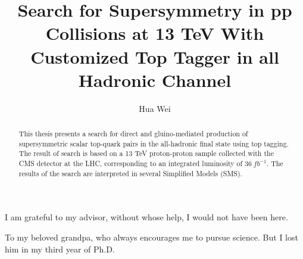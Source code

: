 \documentclass[oneside,final,letterpaper]{ucr}
\begin{document}

\title{Search for Supersymmetry in pp Collisions at 13 TeV With Customized Top Tagger in all Hadronic Channel}
\author{Hua Wei}

\maketitle
\copyrightpage{}
\approvalpage{}

\begin{frontmatter}

\begin{acknowledgements}
I am grateful to my advisor, without whose help, I would not have been here.
\end{acknowledgements}
\begin{dedication}
\null\vfil
{\large
\begin{center}
To my beloved grandpa, who always encourages me to pursue science. But I lost him in my third year of Ph.D.
\end{center}
}
\vfil\null
\end{dedication}
\begin{abstract}
This thesis presents a search for direct and gluino-mediated production of supersymmetric scalar top-quark pairs in the all-hadronic final state using top tagging. The result of search is based on a 13 TeV proton-proton sample collected with the CMS detector at the LHC, corresponding to an integrated luminosity of $36~fb^{-1}$. The results of the search are interpreted in several Simplified Models (SMS).
\end{abstract}
\tableofcontents
\listoffigures
\listoftables
\end{frontmatter}








\nocite{*}
% 



\renewcommand{\theHchapter}{A\arabic{chapter}}
\appendix
{} 


\end{document}
